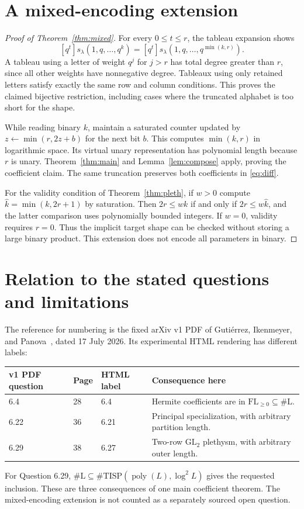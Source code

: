 \documentclass[11pt]{article}
\newcommand{\FLpos}{\mathrm{FL}_{\geq0}}
\newcommand{\sharpL}{\#\mathrm L}
\begin{document}
\section{A mixed-encoding extension}
\begin{proof}[Proof of Theorem~\ref{thm:mixed}]
For every $0\leq t\leq r$, the tableau expansion shows
\begin{equation}\label{eq:truncate}
[q^t]s_\lambda(1,q,\ldots,q^k)
=[q^t]s_\lambda(1,q,\ldots,q^{\min(k,r)}).
\end{equation}
A tableau using a letter of weight $q^j$ for $j>r$ has total degree
greater than $r$, since all other weights have nonnegative degree.
Tableaux using only retained letters satisfy exactly the same row and
column conditions. This proves the claimed bijective restriction,
including cases where the truncated alphabet is too short for the shape.

While reading binary $k$, maintain a saturated counter updated by
$z\leftarrow\min(r,2z+b)$ for the next bit $b$. This computes
$\min(k,r)$ in logarithmic space. Its virtual unary representation has
polynomial length because $r$ is unary. Theorem~\ref{thm:main} and
Lemma~\ref{lem:compose} apply, proving the coefficient claim.
The same truncation preserves both coefficients in \eqref{eq:diff}.

For the validity condition of Theorem~\ref{thm:pleth}, if $w>0$ compute
$\widehat k=\min(k,2r+1)$ by saturation. Then
$2r\leq wk$ if and only if $2r\leq w\widehat k$, and the latter
comparison uses polynomially bounded integers. If $w=0$, validity
requires $r=0$. Thus the implicit target shape can be checked without
storing a large binary product. This extension does not encode all
parameters in binary.
\end{proof}

\section{Relation to the stated questions and limitations}
The reference for numbering is the fixed arXiv v1 PDF of
Guti\'errez, Ikenmeyer, and Panova~\cite{GIP}, dated 17 July 2026.
Its experimental HTML rendering has different labels:
\begin{center}
\small
\begin{tabularx}{\linewidth}{@{}lllX@{}}
\toprule
v1 PDF question & Page & HTML label & Consequence here\\
\midrule
6.4 & 28 & 6.4 & Hermite coefficients are in $\FLpos\subseteq\sharpL$.\\
6.22 & 36 & 6.21 & Principal specialization, with arbitrary partition length.\\
6.29 & 38 & 6.27 & Two-row $\mathrm{GL}_2$ plethysm, with arbitrary outer length.\\
\bottomrule
\end{tabularx}
\end{center}
For Question 6.29, $\sharpL\subseteq
\#\mathrm{TISP}(\operatorname{poly}(L),\log^2L)$ gives the requested
inclusion. These are three consequences of one main coefficient theorem.
The mixed-encoding extension is not counted as a separately sourced
open question.
\end{document}

